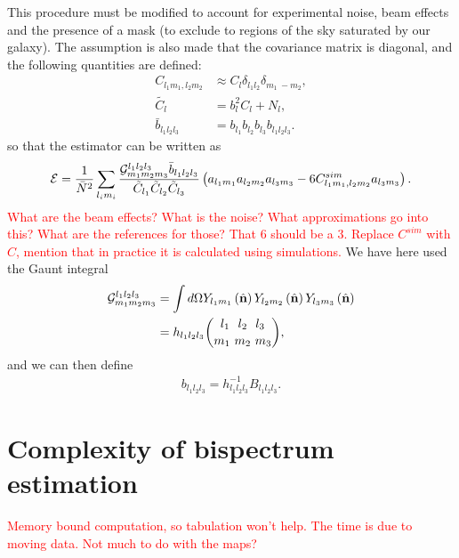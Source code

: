     This procedure must be modified to account for experimental noise, beam effects and
    the presence of a mask (to exclude to regions of the sky saturated by our galaxy).
    The assumption is also made that the covariance matrix is diagonal, and the
    following quantities are defined:
    \begin{align}
        C_{l_1m_1,l_2m_2}&\approx C_l\delta_{l_1l_2}\delta_{m_1~-m_2},\label{diagonal_covariance}\\
           \tilde{C_l} &= b_l^2C_l+N_l,\\
           \bar{b}_{l_1l_2l_3} &= b_{l_1}b_{l_2}b_{l_3}b_{l_1l_2l_3}.
    \end{align}
    so that the estimator can be written as
    \begin{align}
        \mathcal{E} = \frac{1}{\bar{N}^2}\sum_{l_im_i}
        \frac{\mathcal{G}^{l_1l_2l_3}_{m_1m_2m_3}\bar{b}_{l_1l_2l_3}}{\tilde{C}_{l_1}\tilde{C}_{l_2}\tilde{C}_{l_3}}
        \left(a_{l_1m_1}a_{l_2m_2}a_{l_3m_3}-6C^{sim}_{l_1m_1,l_2m_2}a_{l_3m_3}\right).
    \end{align}
    \textcolor{red}{What are the beam effects? What is the noise? What approximations go into this?
    What are the references for those? That 6 should be a 3. Replace $C^{sim}$ with $C$, mention
    that in practice it is calculated using simulations.}
    We have here used the Gaunt integral
    \begin{align}
        \mathcal{G}^{l_1l_2l_3}_{m_1m_2m_3} &= \int d\Omega Y_{l_1m_1}\left(\hat{\mathbf{n}}\right) Y_{l_2m_2}\left(\hat{\mathbf{n}}\right) Y_{l_3m_3}\left(\hat{\mathbf{n}}\right) \\
        &= h_{l_1l_2l_3}{{l_1~~l_2~~l_3} \choose {m_1~m_2~m_3}},
    \end{align}
    and we can then define
    \begin{align}
        b_{l_1l_2l_3} = h^{-1}_{l_1l_2l_3}B_{l_1l_2l_3}.
    \end{align}


    \section{Complexity of bispectrum estimation}

\textcolor{red}{
Memory bound computation, so tabulation won't help. The time is due to moving data.
Not much to do with the maps?}


